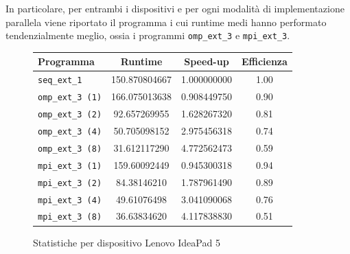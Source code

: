 \documentclass[12pt]{report}
\begin{document}
    In particolare, per entrambi i dispositivi e per ogni modalità di implementazione parallela viene riportato il programma i cui runtime medi hanno performato tendenzialmente meglio, ossia i programmi \texttt{omp\_ext\_3} e \texttt{mpi\_ext\_3}.

    \begin{figure}[H]
        \centering

        \begin{tabular}{ l | c | c | c }
            \textbf{Programma} & \textbf{Runtime} & \textbf{Speed-up} & \textbf{Efficienza}\\
            \hline
            \texttt{seq\_ext\_1} & 150.870804667 & 1.000000000 & 1.00 \\
            \hline
            \texttt{omp\_ext\_3 (1)} & 166.075013638 & 0.908449750 & 0.90 \\
            \texttt{omp\_ext\_3 (2)} & 92.657269955 & 1.628267320 & 0.81 \\
            \texttt{omp\_ext\_3 (4)} & 50.705098152 & 2.975456318 & 0.74 \\
            \texttt{omp\_ext\_3 (8)} & 31.612117290 & 4.772562473 & 0.59 \\
            \hline
            \texttt{mpi\_ext\_3 (1)} & 159.60092449 & 0.945300318 & 0.94 \\
            \texttt{mpi\_ext\_3 (2)} & 84.38146210 & 1.787961490 & 0.89 \\
            \texttt{mpi\_ext\_3 (4)} & 49.61076498 & 3.041090068 & 0.76 \\
            \texttt{mpi\_ext\_3 (8)} & 36.63834620 & 4.117838830 & 0.51 \\
        \end{tabular}
        \caption{Statistiche per dispositivo Lenovo IdeaPad 5}
        \label{fig:stats_ip5_1}
    \end{figure}
\end{document}
